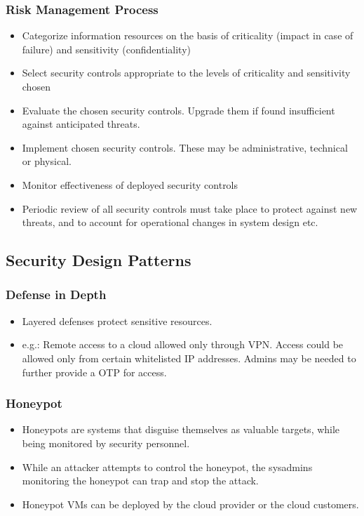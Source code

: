 \documentclass{article}
\begin{document}
\subsubsection{Risk Management Process}
\begin{itemize}
    \item Categorize information resources on the basis of criticality (impact in case of failure) and sensitivity (confidentiality)
    
    \item Select security controls appropriate to the levels of criticality and sensitivity chosen
    
    \item Evaluate the chosen security controls. Upgrade them if found insufficient against anticipated threats.
    
    \item Implement chosen security controls. These may be administrative, technical or physical. 
    
    \item Monitor effectiveness of deployed security controls
    
    \item Periodic review of all security controls must take place to protect against new threats, and to account for operational changes in system design etc. 
\end{itemize}

\subsection{Security Design Patterns}
\subsubsection{Defense in Depth}
\begin{itemize}
    \item Layered defenses protect sensitive resources. 
    
    \item e.g.: Remote access to a cloud allowed only through VPN. Access could be allowed only from certain whitelisted IP addresses. Admins may be needed to further provide a OTP for access. 
\end{itemize}

\subsubsection{Honeypot}
\begin{itemize}
    \item Honeypots are systems that disguise themselves as valuable targets, while being monitored by security personnel.
    
    \item While an attacker attempts to control the honeypot, the sysadmins monitoring the honeypot can trap and stop the attack. 
    
    \item Honeypot VMs can be deployed by the cloud provider or the cloud customers.
\end{itemize}
\end{document}

